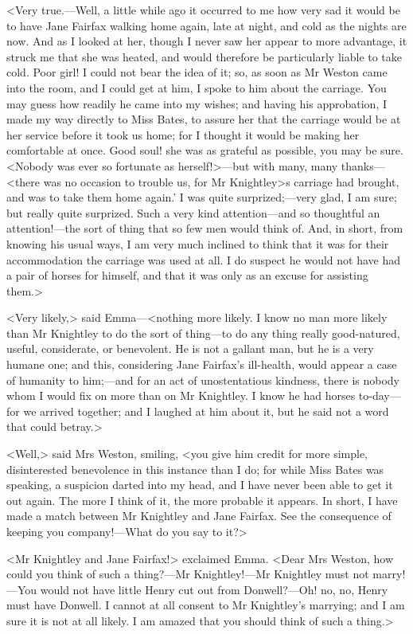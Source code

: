 <Very true.—Well, a little while ago it occurred to me how very sad it would be to have Jane Fairfax walking home again, late at night, and cold as the nights are now. And as I looked at her, though I never saw her appear to more advantage, it struck me that she was heated, and would therefore be particularly liable to take cold. Poor girl! I could not bear the idea of it; so, as soon as Mr Weston came into the room, and I could get at him, I spoke to him about the carriage. You may guess how readily he came into my wishes; and having his approbation, I made my way directly to Miss Bates, to assure her that the carriage would be at her service before it took us home; for I thought it would be making her comfortable at once. Good soul! she was as grateful as possible, you may be sure. <Nobody was ever so fortunate as herself!>—but with many, many thanks—<there was no occasion to trouble us, for Mr Knightley>s carriage had brought, and was to take them home again.' I was quite surprized;—very glad, I am sure; but really quite surprized. Such a very kind attention—and so thoughtful an attention!—the sort of thing that so few men would think of. And, in short, from knowing his usual ways, I am very much inclined to think that it was for their accommodation the carriage was used at all. I do suspect he would not have had a pair of horses for himself, and that it was only as an excuse for assisting them.>

<Very likely,> said Emma—<nothing more likely. I know no man more likely than Mr Knightley to do the sort of thing—to do any thing really good-natured, useful, considerate, or benevolent. He is not a gallant man, but he is a very humane one; and this, considering Jane Fairfax's ill-health, would appear a case of humanity to him;—and for an act of unostentatious kindness, there is nobody whom I would fix on more than on Mr Knightley. I know he had horses to-day—for we arrived together; and I laughed at him about it, but he said not a word that could betray.>

<Well,> said Mrs Weston, smiling, <you give him credit for more simple, disinterested benevolence in this instance than I do; for while Miss Bates was speaking, a suspicion darted into my head, and I have never been able to get it out again. The more I think of it, the more probable it appears. In short, I have made a match between Mr Knightley and Jane Fairfax. See the consequence of keeping you company!—What do you say to it?>

<Mr Knightley and Jane Fairfax!> exclaimed Emma. <Dear Mrs Weston, how could you think of such a thing?—Mr Knightley!—Mr Knightley must not marry!—You would not have little Henry cut out from Donwell?—Oh! no, no, Henry must have Donwell. I cannot at all consent to Mr Knightley's marrying; and I am sure it is not at all likely. I am amazed that you should think of such a thing.>

